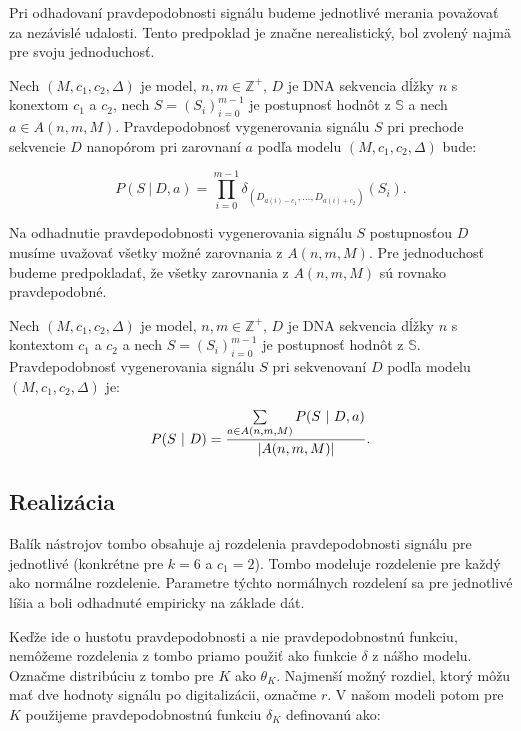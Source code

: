 Pri odhadovaní pravdepodobnosti signálu budeme jednotlivé merania považovať za nezávislé udalosti.
Tento predpoklad je značne nerealistický, bol zvolený najmä pre svoju jednoduchosť.

\begin{definicia}

Nech $(M, c_1, c_2, \Delta)$ je  model, $n, m \in \mathbb{Z}^+$, $D$ je DNA sekvencia dĺžky $n$ s konextom
$c_1$ a $c_2$, nech $S = (S_i)_{i=0}^{m-1}$ je postupnosť hodnôt z $\mathbb{S}$ a nech 
$a \in A(n, m, M)$. Pravdepodobnosť vygenerovania signálu $S$ pri prechode sekvencie $D$ nanopórom
pri zarovnaní $a$ podľa modelu $(M, c_1, c_2, \Delta)$ bude:

$$P(S ~|~ D, a) = \prod\limits_{i=0}^{m-1} \delta_{(D_{a(i)-c_1}, \dots, D_{a(i)+c_2})}(S_i) \text{.}$$

\end{definicia}

Na odhadnutie pravdepodobnosti vygenerovania signálu $S$ postupnosťou $D$ musíme uvažovať všetky možné
zarovnania z $A(n, m, M)$. Pre jednoduchosť budeme predpokladať, že všetky zarovnania z $A(n, m, M)$ sú rovnako pravdepodobné.

\begin{definicia}

Nech $(M, c_1, c_2, \Delta)$ je  model, $n, m \in \mathbb{Z}^+$, $D$ je DNA sekvencia dĺžky $n$ s kontextom $c_1$ a $c_2$ a nech $S = (S_i)_{i=0}^{m-1}$ je postupnosť hodnôt z $\mathbb{S}$.
Pravdepodobnosť vygenerovania signálu $S$ pri sekvenovaní $D$ podľa modelu $(M, c_1, c_2, \Delta)$ je:

$$P(S ~|~ D) =  \frac{\sum\limits_{a \in A(n, m, M)} P(S ~|~ D, a)}{\abs*{A(n, m, M)}} \text{.}$$
\end{definicia}



\subsection{Realizácia}

Balík nástrojov tombo obsahuje aj rozdelenia pravdepodobnosti signálu pre jednotlivé  (konkrétne pre $k=6$ a
$c_1 = 2$). Tombo modeluje rozdelenie pre každý \kmer{} ako normálne rozdelenie. Parametre týchto normálnych rozdelení
sa pre jednotlivé  líšia a boli odhadnuté empiricky na základe dát. 

Keďže ide o hustotu pravdepodobnosti a nie pravdepodobnostnú funkciu, nemôžeme rozdelenia z tombo priamo použiť
ako funkcie $\delta$ z nášho modelu. Označme distribúciu z tombo pre \kmer{} $K$ ako $\theta_K$. Najmenší možný rozdiel,
ktorý môžu mať dve hodnoty signálu po digitalizácii, označme $r$. V našom modeli potom pre \kmer{} $K$ použijeme
pravdepodobnostnú funkciu $\delta_K$ definovanú ako:

